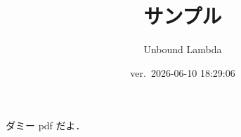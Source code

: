 \documentclass[a4j,11pt,dvipdfmx]{jsarticle}
\title{サンプル}
\author{Unbound Lambda}
\date{ver.~2026-06-10 18:29:06}
\begin{document}
\maketitle

ダミー pdf だよ．
\end{document}
